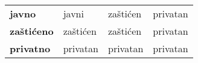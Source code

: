 \documentclass{article}
\newenvironment{xitemize}{%
    
    \itemize
    \larger
}{%
    \enditemize
}
\let\olditemize\itemize
\let\endolditemize\enditemize
\renewenvironment{itemize}{%
    \smaller
    \olditemize
}{%
    \endolditemize
}
\begin{document}
\begin{xitemize}
\begin{multicols}{2}
\begin{itemize}
\begin{table}[ht]
\begin{tabular}{|l|lll}
    \textbf{javno}                                             & \cellcolor[HTML]{DAE8FC}javni       & \cellcolor[HTML]{DAE8FC}zaštićen        & \cellcolor[HTML]{DAE8FC}privatan       \\ \cline{1-1}
    \textbf{zaštićeno}                                         & \cellcolor[HTML]{DAE8FC}zaštićen    & \cellcolor[HTML]{DAE8FC}zaštićen        & \cellcolor[HTML]{DAE8FC}privatan       \\ \cline{1-1}
    \textbf{privatno}                                          & \cellcolor[HTML]{DAE8FC}privatan    & \cellcolor[HTML]{DAE8FC}privatan        & \cellcolor[HTML]{DAE8FC}privatan       \\ \cline{1-1}
    \end{tabular}
    \end{table}
    

\end{itemize}
\end{multicols}
\end{xitemize}
\end{document}
